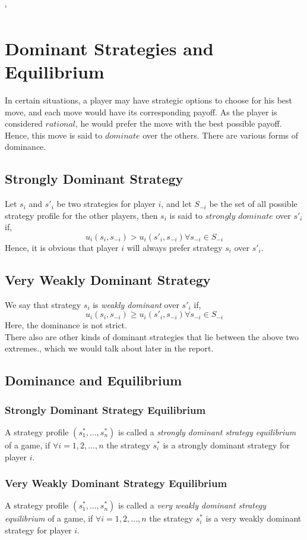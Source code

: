 `\section{Dominant Strategies and Equilibrium}

In certain situations,  a player may have strategic options to choose for his best move, and each move would have its corresponding payoff. As the player is considered $rational$, he would prefer the move with the best possible payoff. Hence, this move is said to $dominate$ over the others. There are various forms of dominance.

\subsection{Strongly Dominant Strategy}
Let $s_i$ and $s'_i$ be two strategies for player $i$, and let $S_{-i}$ be the set of all possible strategy profile for the other players, then $s_i$ is said to $strongly$ $dominate$ over $s'_i$ if, $$u_i(s_i, s_{-i})> u_i(s'_i, s_{-i}) \forall s_{-i} \in S_{-i}$$
Hence, it is obvious that player $i$ will always prefer strategy $s_i$ over $s'_i$.

\subsection{Very Weakly Dominant Strategy}

We say that strategy $s_i$ is \textit{weakly dominant} over $s'_i$ if, $$u_i(s_i, s_{-i}) \geq u_i(s'_i, s_{-i}) \forall s_{-i} \in S_{-i}$$
Here, the dominance is not strict.\\
There also are other kinds of dominant strategies that lie between the above two extremes., which we would talk about later in the report.
\subsection{Dominance and Equilibrium}

\subsubsection{Strongly Dominant Strategy Equilibrium}

A strategy profile $(s^*_1, \dots , s^*_n)$ is called a \textit{strongly dominant strategy equilibrium} of a game, if $\forall i = 1, 2, \dots , n$ the strategy $s^*_i$ is a strongly dominant strategy for player $i$. 

\subsubsection{Very Weakly Dominant Strategy Equilibrium}

A strategy profile $(s^*_1, \dots , s^*_n)$ is called a \textit{very weakly dominant strategy equilibrium} of a game, if $\forall i = 1, 2, \dots , n$ the strategy $s^*_i$ is a very weakly dominant strategy for player $i$. 

